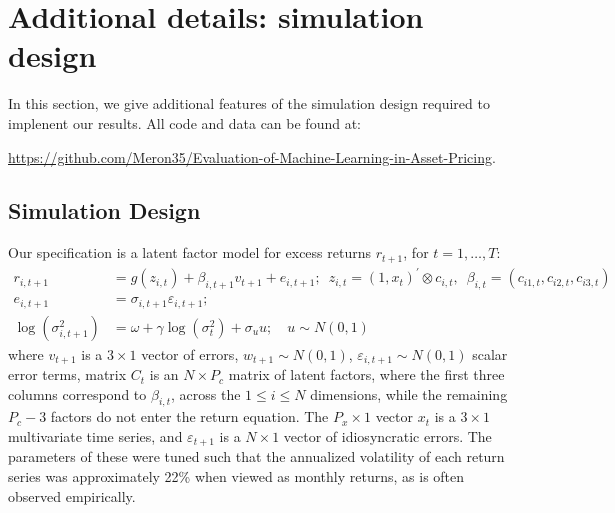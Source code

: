 \documentclass{article}
\begin{document}
\newpage

\section{Additional details: simulation design}
In this section, we give additional features of the simulation design required to implenent our results. All code and data can be found at:

\url{https://github.com/Meron35/Evaluation-of-Machine-Learning-in-Asset-Pricing}.

\subsection{Simulation Design}\label{app:simDesign}
Our specification is a latent factor model for excess returns $r_{t+1}$, for $t=1, \dots, T$:
\begin{align*}
r_{i, t+1} &= 
g\left(z_{i, t}\right) + \beta_{i,t+1}v_{t+1} + e_{i, t+1}; 
\enspace z_{i, t} = \left(1, x_{t}\right)^{\prime} \otimes c_{i, t}, 
\enspace \beta_{i, t} = \left(c_{i 1, t}, c_{i 2, t}, c_{i 3, t}\right) \\ 
e_{i, t+1} &= 
\sigma_{i, t+1} \varepsilon_{i, t+1}; \\
\operatorname{log} (\sigma^2_{i,t+1}) &= 
\omega + \gamma \operatorname{log} (\sigma^2_{t}) + \sigma_{u}u;
\quad u \sim N(0, 1)
\end{align*}
where $v_{t+1}$ is a $3\times 1$ vector of errors, $w_{t+1} \sim N(0, 1)$,  $\varepsilon_{i,t+1} \sim N(0, 1)$ scalar error terms, matrix $C_t$ is an $N\times P_c$ matrix of latent factors, where the first three columns correspond to $\beta_{i,t}$, across the $1\leq i\leq N$ dimensions, while the remaining $P_c-3$ factors do not enter the return equation. The $P_x\times1$ vector $x_t$ is a $3 \times 1$ multivariate time series, and $\varepsilon_{t+1}$ is a $N\times 1$ vector of idiosyncratic errors. The parameters of these were tuned such that the annualized volatility of each return series was approximately 22\% when viewed as monthly returns, as is often observed empirically.
\end{document}
